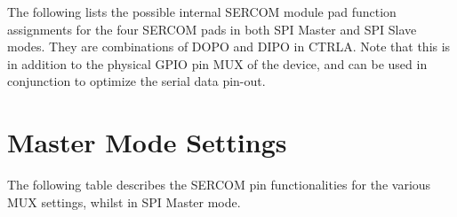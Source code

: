 The following lists the possible internal S\+E\+R\+C\+OM module pad function assignments for the four S\+E\+R\+C\+OM pads in both S\+PI Master and S\+PI Slave modes. They are combinations of D\+O\+PO and D\+I\+PO in C\+T\+R\+LA. Note that this is in addition to the physical G\+P\+IO pin M\+UX of the device, and can be used in conjunction to optimize the serial data pin-\/out.\hypertarget{asfdoc_sam0_sercom_spi_mux_settings_asfdoc_sam0_sercom_spi_mux_settings_master}{}\section{Master Mode Settings}\label{asfdoc_sam0_sercom_spi_mux_settings_asfdoc_sam0_sercom_spi_mux_settings_master}
The following table describes the S\+E\+R\+C\+OM pin functionalities for the various M\+UX settings, whilst in S\+PI Master mode.


